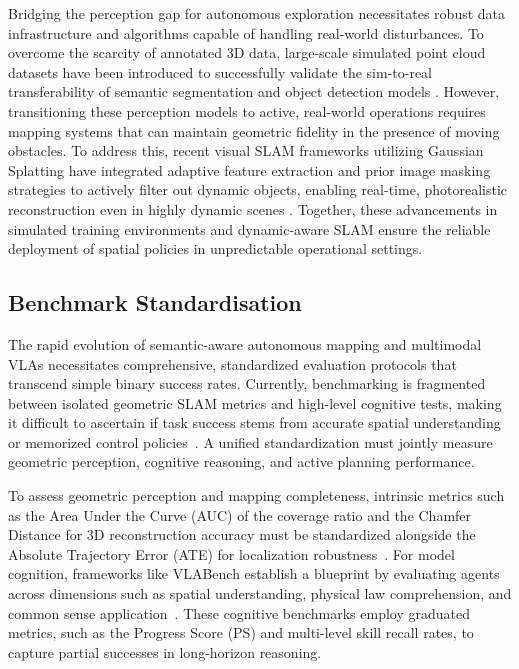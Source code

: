 \documentclass[conference]{IEEEtran}
\begin{document}
Bridging the perception gap for autonomous exploration necessitates robust data infrastructure and algorithms capable of handling real-world disturbances. To overcome the scarcity of annotated 3D data, large-scale simulated point cloud datasets have been introduced to successfully validate the sim-to-real transferability of semantic segmentation and object detection models \cite{10120633}. However, transitioning these perception models to active, real-world operations requires mapping systems that can maintain geometric fidelity in the presence of moving obstacles. To address this, recent visual SLAM frameworks utilizing Gaussian Splatting have integrated adaptive feature extraction and prior image masking strategies to actively filter out dynamic objects, enabling real-time, photorealistic reconstruction even in highly dynamic scenes \cite{11208982}. Together, these advancements in simulated training environments and dynamic-aware SLAM ensure the reliable deployment of spatial policies in unpredictable operational settings.

\subsection{Benchmark Standardisation}
\label{subsec:disc_benchmarks}

The rapid evolution of semantic-aware autonomous mapping and multimodal VLAs necessitates comprehensive, standardized evaluation protocols that transcend simple binary success rates. Currently, benchmarking is fragmented between isolated geometric SLAM metrics and high-level cognitive tests, making it difficult to ascertain if task success stems from accurate spatial understanding or memorized control policies~\cite{semantic_survey2025}. A unified standardization must jointly measure geometric perception, cognitive reasoning, and active planning performance.

To assess geometric perception and mapping completeness, intrinsic metrics such as the Area Under the Curve (AUC) of the coverage ratio and the Chamfer Distance for 3D reconstruction accuracy must be standardized alongside the Absolute Trajectory Error (ATE) for localization robustness~\cite{chen2024gennbv, semantic_survey2025}. For model cognition, frameworks like VLABench establish a blueprint by evaluating agents across dimensions such as spatial understanding, physical law comprehension, and common sense application~\cite{zhang2024vlabench}. These cognitive benchmarks employ graduated metrics, such as the Progress Score (PS) and multi-level skill recall rates, to capture partial successes in long-horizon reasoning.
\end{document}
